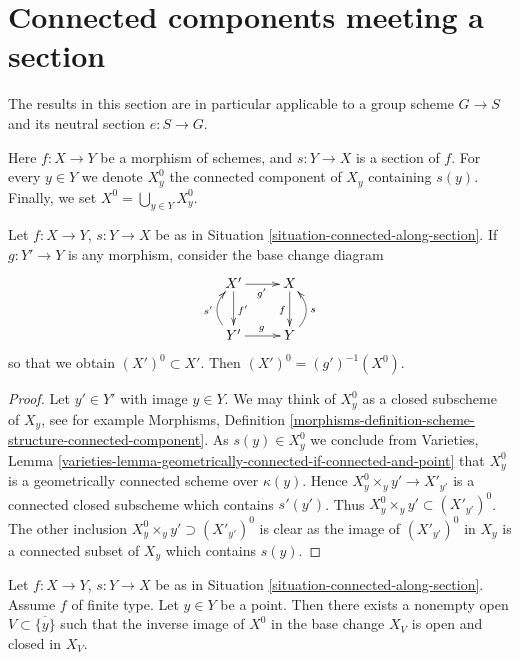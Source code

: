 \section{Connected components meeting a section}
\label{section-connected-components}

\noindent
The results in this section are in particular applicable to a group scheme
$G \to S$ and its neutral section $e : S \to G$.

\begin{situation}
\label{situation-connected-along-section}
Here $f : X \to Y$ be a morphism of schemes, and
$s : Y \to X$ is a section of $f$.
For every $y \in Y$ we denote $X^0_y$ the connected component of $X_y$
containing $s(y)$. Finally, we set $X^0 = \bigcup_{y \in Y} X^0_y$.
\end{situation}

\begin{lemma}
\label{lemma-base-change-connected-along-section}
Let $f : X \to Y$, $s : Y \to X$ be as in
Situation \ref{situation-connected-along-section}.
If $g : Y' \to Y$ is any morphism, consider the base change diagram
$$
\xymatrix{
X' \ar[r]_{g'} \ar[d]^{f'} & X \ar[d]_f \\
Y' \ar@/^1pc/[u]^{s'} \ar[r]^g & Y \ar@/_1pc/[u]_s
}
$$
so that we obtain $(X')^0 \subset X'$.
Then $(X')^0 = (g')^{-1}(X^0)$.
\end{lemma}

\begin{proof}
Let $y' \in Y'$ with image $y \in Y$. We may think of
$X^0_y$ as a closed subscheme of $X_y$, see for example
Morphisms,
Definition \ref{morphisms-definition-scheme-structure-connected-component}.
As $s(y) \in X^0_y$ we conclude from
Varieties, Lemma
\ref{varieties-lemma-geometrically-connected-if-connected-and-point}
that $X_y^0$ is a geometrically connected scheme over $\kappa(y)$.
Hence $X_y^0 \times_y y' \to X'_{y'}$ is a connected closed subscheme
which contains $s'(y')$. Thus $X_y^0 \times_y y' \subset (X'_{y'})^0$.
The other inclusion $X_y^0 \times_y y' \supset (X'_{y'})^0$ is clear
as the image of $(X'_{y'})^0$ in $X_y$ is a connected subset of $X_y$ which
contains $s(y)$.
\end{proof}

\begin{lemma}
\label{lemma-connected-along-section-good}
Let $f : X \to Y$, $s : Y \to X$ be as in
Situation \ref{situation-connected-along-section}.
Assume $f$ of finite type. Let $y \in Y$ be a point.
Then there exists a nonempty open $V \subset \overline{\{y\}}$ such that
the inverse image of $X^0$ in the base change $X_V$ is open and closed in
$X_V$.
\end{lemma}

